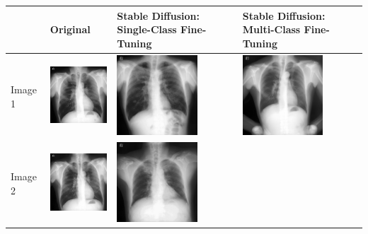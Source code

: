 \begin{table}[H]
\centering
\begin{tabularx}{\linewidth}{@{}>{\centering\arraybackslash}m{1.5cm}>{\centering\arraybackslash}X>{\centering\arraybackslash}X>{\centering\arraybackslash}X@{}}
\toprule
 & Original & Stable Diffusion: Single-Class Fine-Tuning & Stable Diffusion: Multi-Class Fine-Tuning \\
\midrule
Image 1 & 
\includegraphics[valign=M,width=\linewidth,height=3cm,keepaspectratio]{main/content/images/sd_dreambooth/original_dataset/pneumo_54.png} & 
\includegraphics[valign=M,width=\linewidth,height=3cm,keepaspectratio]{main/content/images/sd_dreambooth/dreambooth_v1/59122.jpg} & 
\includegraphics[valign=M,width=\linewidth,height=3cm,keepaspectratio]{main/content/images/sd_dreambooth/dreambooth_v1_multiclass/0.png} \\
\midrule
Image 2 & 
\includegraphics[valign=M,width=\linewidth,height=3cm,keepaspectratio]{main/content/images/sd_dreambooth/original_dataset/pneumo_55.png} & 
\includegraphics[valign=M,width=\linewidth,height=3cm,keepaspectratio]{main/content/images/sd_dreambooth/dreambooth_v1/59124.jpg} & 

\end{tabularx}
\end{table}
